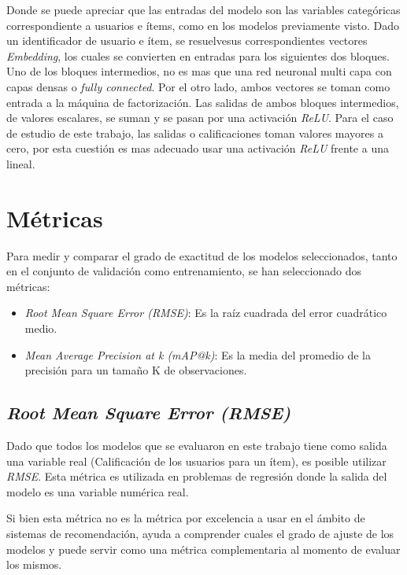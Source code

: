 \documentclass[11pt,a4paper,twoside]{thesis}
\begin{document}
Donde se puede apreciar que las entradas del modelo son las variables
categóricas correspondiente a usuarios e ítems, como en los modelos previamente
visto. Dado un identificador de usuario e ítem, se resuelvesus correspondientes
vectores \textit{Embedding}, los cuales se convierten en entradas para los
siguientes dos bloques. Uno de los bloques intermedios, no es mas que una red
neuronal multi capa con capas densas o \textit{fully connected}. Por el otro
lado, ambos vectores se toman como entrada a la máquina de factorización. Las
salidas de ambos bloques intermedios, de valores escalares, se suman y se pasan
por una activación \textit{ReLU}. Para el caso de estudio de este trabajo, las
salidas o calificaciones toman valores mayores a cero, por esta cuestión es mas
adecuado usar una activación \textit{ReLU} frente a una lineal.

\section{Métricas}
\label{sec:metrics}

Para medir y comparar el grado de exactitud de los modelos seleccionados, tanto
en el conjunto de validación como entrenamiento, se han seleccionado dos
métricas:

\begin{itemize}
	\item \textit{Root Mean Square Error (RMSE)}: Es la raíz cuadrada del error
	      cuadrático medio.
	\item \textit{Mean Average Precision at k (mAP@k)}: Es la media del
	      promedio de la precisión  para un tamaño K de observaciones.
\end{itemize}

\subsection{\textit{Root Mean Square Error (RMSE)}}
\label{sec:rmse_ref}

Dado que todos los modelos que se evaluaron en este trabajo tiene como salida
una variable real (Calificación de los usuarios para un ítem), es posible
utilizar \textit{RMSE}. Esta métrica es utilizada en problemas de regresión
donde la salida del modelo es una variable numérica real.

Si bien esta métrica no es la métrica por excelencia a usar en el ámbito de
sistemas de recomendación, ayuda a comprender cuales el grado de ajuste de los
modelos y puede servir como una métrica complementaria al momento de evaluar
los mismos.
\end{document}
